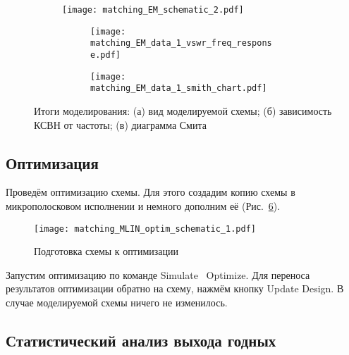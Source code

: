 \begin{figure}[!ht]
    \centering
    \begin{subfigure}[b]{0.6\textwidth}
        \centering
        \texttt{[image: matching\_EM\_schematic\_2.pdf]}
        \caption{}%
        \label{fig:matching_EM_schematic_2}
    \end{subfigure}
    \hfill
    \begin{subfigure}[b]{0.35\textwidth}
        \begin{subfigure}[b]{0.5\textwidth}
            \centering
            \texttt{[image: matching\_EM\_data\_1\_vswr\_freq\_response.pdf]}
            \caption{}%
            \label{fig:matching_EM_data_1_vswr_freq_response}
        \end{subfigure}
        \vfill
        \begin{subfigure}[b]{0.5\textwidth}
            \centering
            \texttt{[image: matching\_EM\_data\_1\_smith\_chart.pdf]}
            \caption{}%
            \label{fig:matching_EM_data_1_smith_chart}
        \end{subfigure}
    \end{subfigure}
    \caption{%
        Итоги моделирования:
        (а) вид моделируемой схемы;
        (б) зависимость КСВН от частоты;
        (в) диаграмма Смита
    }%
    \label{fig:matching_EM_data_1}
\end{figure}

\subsection{Оптимизация}

Проведём оптимизацию схемы.
Для этого создадим копию схемы в микрополосковом исполнении и немного дополним её (Рис.~\ref{fig:matching_MLIN_optim_schematic_1}).

\begin{figure}[!ht]
    \centering
    \texttt{[image: matching\_MLIN\_optim\_schematic\_1.pdf]}
    \caption{Подготовка схемы к оптимизации}%
    \label{fig:matching_MLIN_optim_schematic_1}
\end{figure}

Запустим оптимизацию по команде Simulate \textrightarrow\ Optimize.
Для переноса результатов оптимизации обратно на схему, нажмём кнопку Update Design.
В случае моделируемой схемы ничего не изменилось.

\subsection{Статистический анализ выхода годных}

